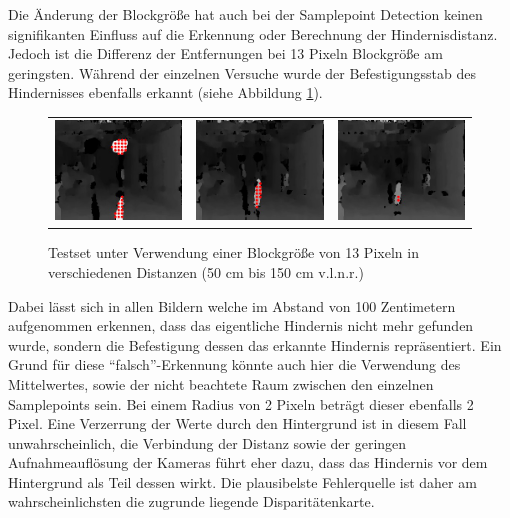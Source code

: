 \noindent
Die Änderung der Blockgröße hat auch bei der Samplepoint Detection keinen signifikanten Einfluss auf die Erkennung oder Berechnung der Hindernisdistanz. Jedoch ist die Differenz der Entfernungen bei 13 Pixeln Blockgröße am geringsten. Während der einzelnen Versuche wurde der Befestigungsstab des Hindernisses ebenfalls erkannt (siehe Abbildung \ref{fig:distance_sample_images}).

\begin{figure}[h]
	\centering
	\begin{tabular}{ccc}
	\includegraphics[width=4cm]{img/evaluation/distance_sample/_test_0_disparity}&
	\includegraphics[width=4cm]{img/evaluation/distance_sample/_test_1_disparity}&
	\includegraphics[width=4cm]{img/evaluation/distance_sample/_test_2_disparity}
	\end{tabular}
	\caption{Testset unter Verwendung einer Blockgröße von 13 Pixeln in verschiedenen Distanzen (50 cm bis 150 cm v.l.n.r.)}
	\label{fig:distance_sample_images}
\end{figure}

\noindent
Dabei lässt sich in allen Bildern welche im Abstand von 100 Zentimetern aufgenommen erkennen, dass das eigentliche Hindernis nicht mehr gefunden wurde, sondern die Befestigung dessen das erkannte Hindernis repräsentiert. Ein Grund für diese \enquote{falsch}-Erkennung könnte auch hier die Verwendung des Mittelwertes, sowie der nicht beachtete Raum zwischen den einzelnen Samplepoints sein. Bei einem Radius von 2 Pixeln beträgt dieser ebenfalls 2 Pixel. Eine Verzerrung der Werte durch den Hintergrund ist in diesem Fall unwahrscheinlich, die Verbindung der Distanz sowie der geringen Aufnahmeauflösung der Kameras führt eher dazu, dass das Hindernis vor dem Hintergrund als Teil dessen wirkt. Die plausibelste Fehlerquelle ist daher am wahrscheinlichsten die zugrunde liegende Disparitätenkarte.

